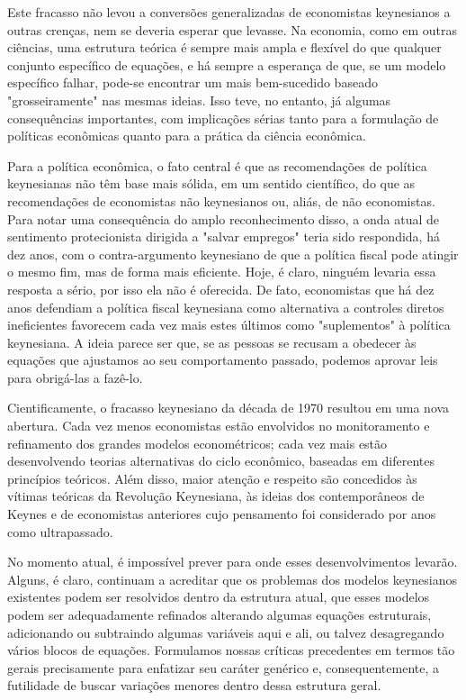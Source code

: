 \documentclass[12pt]{article}
\begin{document}
Este fracasso não levou a conversões generalizadas de economistas keynesianos a outras crenças, nem se deveria esperar que levasse. Na economia, como em outras ciências, uma estrutura teórica é sempre mais ampla e flexível do que qualquer conjunto específico de equações, e há sempre a esperança de que, se um modelo específico falhar, pode-se encontrar um mais bem-sucedido baseado "grosseiramente" nas mesmas ideias. Isso teve, no entanto, já algumas consequências importantes, com implicações sérias tanto para a formulação de políticas econômicas quanto para a prática da ciência econômica.

Para a política econômica, o fato central é que as recomendações de política keynesianas não têm base mais sólida, em um sentido científico, do que as recomendações de economistas não keynesianos ou, aliás, de não economistas. Para notar uma consequência do amplo reconhecimento disso, a onda atual de sentimento protecionista dirigida a "salvar empregos" teria sido respondida, há dez anos, com o contra-argumento keynesiano de que a política fiscal pode atingir o mesmo fim, mas de forma mais eficiente. Hoje, é claro, ninguém levaria essa resposta a sério, por isso ela não é oferecida. De fato, economistas que há dez anos defendiam a política fiscal keynesiana como alternativa a controles diretos ineficientes favorecem cada vez mais estes últimos como "suplementos" à política keynesiana. A ideia parece ser que, se as pessoas se recusam a obedecer às equações que ajustamos ao seu comportamento passado, podemos aprovar leis para obrigá-las a fazê-lo.

Cientificamente, o fracasso keynesiano da década de 1970 resultou em uma nova abertura. Cada vez menos economistas estão envolvidos no monitoramento e refinamento dos grandes modelos econométricos; cada vez mais estão desenvolvendo teorias alternativas do ciclo econômico, baseadas em diferentes princípios teóricos. Além disso, maior atenção e respeito são concedidos às vítimas teóricas da Revolução Keynesiana, às ideias dos contemporâneos de Keynes e de economistas anteriores cujo pensamento foi considerado por anos como ultrapassado.

No momento atual, é impossível prever para onde esses desenvolvimentos levarão. Alguns, é claro, continuam a acreditar que os problemas dos modelos keynesianos existentes podem ser resolvidos dentro da estrutura atual, que esses modelos podem ser adequadamente refinados alterando algumas equações estruturais, adicionando ou subtraindo algumas variáveis aqui e ali, ou talvez desagregando vários blocos de equações. Formulamos nossas críticas precedentes em termos tão gerais precisamente para enfatizar seu caráter genérico e, consequentemente, a futilidade de buscar variações menores dentro dessa estrutura geral.
\end{document}
